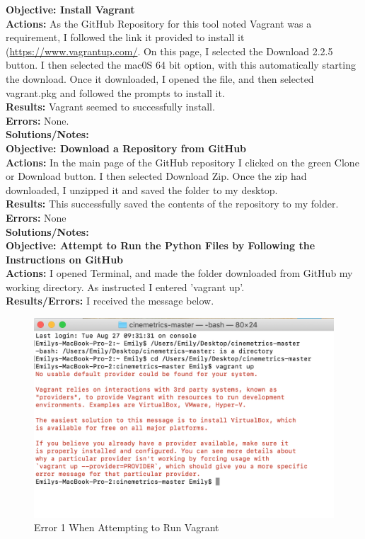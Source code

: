 \documentclass{article}
\begin{document}
\textbf{Objective: Install Vagrant}\\
\textbf{Actions:} As the GitHub Repository for this tool noted Vagrant was a requirement, I followed the link it provided to install it (\url{https://www.vagrantup.com/}. On this page, I selected the Download 2.2.5 button. I then selected the mac0S 64 bit option, with this automatically starting the download. Once it downloaded, I opened the file, and then selected vagrant.pkg and followed the prompts to install it.  \\
\textbf{Results:} Vagrant seemed to successfully install.\\
\textbf{Errors:} None.\\
\textbf{Solutions/Notes:}\\

\textbf{Objective: Download a Repository from GitHub}\\
\textbf{Actions:} In the main page of the GitHub repository I clicked on the green Clone or Download button. I then selected Download Zip. Once the zip had downloaded, I unzipped it and saved the folder to my desktop.\\
\textbf{Results:} This successfully saved the contents of the repository to my folder.\\
\textbf{Errors:} None\\
\textbf{Solutions/Notes:}\\

\textbf{Objective: Attempt to Run the Python Files by Following the Instructions on GitHub}\\
\textbf{Actions:} I opened Terminal, and made the folder downloaded from GitHub my working directory. As instructed I entered 'vagrant up'.\\
\textbf{Results/Errors:} I received the message below.
\begin{figure}[htp]
    \centering
    \includegraphics[width=12cm]{Vagrant_Image_1.png}
    \caption{Error 1 When Attempting to Run Vagrant}
\end{figure}
\end{document}
